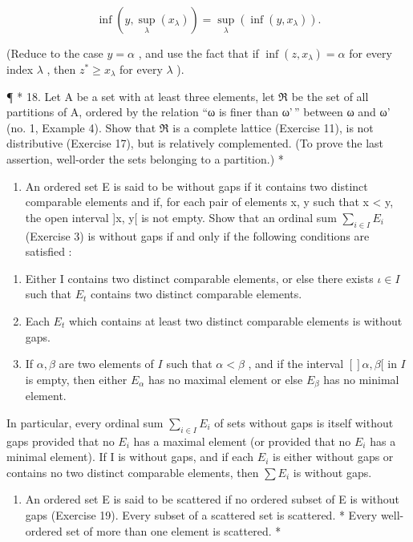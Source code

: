 \[
\inf (y, \sup _ {\lambda} (x _ {\lambda})) = \sup _ {\lambda} (\inf (y, x _ {\lambda})).
\]

(Reduce to the case \(y = \alpha\) , and use the fact that if \(\inf (z, x_{\lambda}) = \alpha\) for every index \(\lambda\) , then \(z^{*} \geqslant x_{\lambda}\) for every \(\lambda\) ).

¶ * 18. Let A be a set with at least three elements, let ℜ be the set of all partitions of A, ordered by the relation ``ω is finer than ω'\,'' between ω and ω' (no. 1, Example 4). Show that ℜ is a complete lattice (Exercise 11), is not distributive (Exercise 17), but is relatively complemented. (To prove the last assertion, well-order the sets belonging to a partition.) *

\begin{enumerate}
\def\labelenumi{\arabic{enumi}.}
\setcounter{enumi}{18}
\tightlist
\item
  An ordered set E is said to be without gaps if it contains two distinct comparable elements and if, for each pair of elements x, y such that x \textless{} y, the open interval {]}x, y{[} is not empty. Show that an ordinal sum \(\sum_{i\in I}E_{i}\) (Exercise 3) is without gaps if and only if the following conditions are satisfied :
\end{enumerate}

\begin{enumerate}
\def\labelenumi{(\Roman{enumi})}
\item
  Either I contains two distinct comparable elements, or else there exists \(\iota \in I\) such that \(E_{t}\) contains two distinct comparable elements.
\item
  Each \(E_{t}\) which contains at least two distinct comparable elements is without gaps.
\item
  If \(\alpha, \beta\) are two elements of \(I\) such that \(\alpha < \beta\) , and if the interval \([]\alpha, \beta[\) in \(I\) is empty, then either \(E_{\alpha}\) has no maximal element or else \(E_{\beta}\) has no minimal element.
\end{enumerate}

In particular, every ordinal sum \(\sum_{i\in I}E_i\) of sets without gaps is itself without gaps provided that no \(E_i\) has a maximal element (or provided that no \(E_i\) has a minimal element). If I is without gaps, and if each \(E_i\) is either without gaps or contains no two distinct comparable elements, then \(\sum E_i\) is without gaps.

\begin{enumerate}
\def\labelenumi{\arabic{enumi}.}
\setcounter{enumi}{19}
\tightlist
\item
  An ordered set E is said to be scattered if no ordered subset of E is without gaps (Exercise 19). Every subset of a scattered set is scattered. * Every well-ordered set of more than one element is scattered. *
\end{enumerate}

